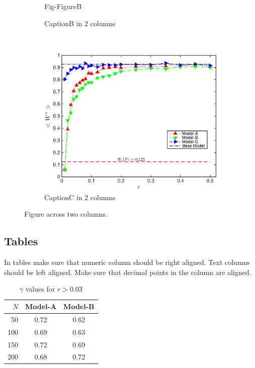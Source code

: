 \documentclass[pre,twocolumn,showkeys,longbibliography]{revtex4-1}
\theoremstyle{plain}
\theoremstyle{definition}
\theoremstyle{remark}
\begin{document}
\begin{figure}[!tbp]
\begin{subfigure}{\columnwidth}
			{Fig-FigureB}
		\caption{CaptionB in 2 columns} 
		\label{fig:figureBin2}
	\end{subfigure}\\
	\begin{subfigure}{\columnwidth}%
		\includegraphics[width=\columnwidth]
			{Fig-FigureC}
		\caption{CaptionC in 2 columns} 
		\label{fig:figureCin2}
	\end{subfigure}
	\caption{
		Figure across two columns.
	} 
	\label{fig:twoColumn}
\end{figure}



\subsection{Tables}

In tables make sure that numeric column should be right aligned.
Text columns should be left aligned.
Make sure that decimal points in the column are aligned.

\begin{table}[th]
	\caption{$\gamma$ values for $r > 0.03$}
	\begin{center}
	\begin{tabular}{|r|cc|}
		\hline
		$N$
		&Model-A %
		&Model-B\\
		\hline
		50
		&0.72
		&0.62\\
		100
		&0.69
		&0.63\\
		150
		&0.72
		&0.69\\
		200
		&0.68
		&0.72\\
		\hline
	\end{tabular}
	\end{center}
	\label{tbl:tableA}
\end{table}%
\end{document}
